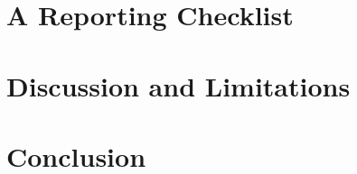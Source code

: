 \documentclass[conference]{../06_Manuscript/template/IEEEtran/IEEEtran}
\begin{document}
\section{A Reporting Checklist}
\label{sec:checklist}


\section{Discussion and Limitations}
\label{sec:discussion}


\section{Conclusion}
\label{sec:conclusion}



\end{document}
